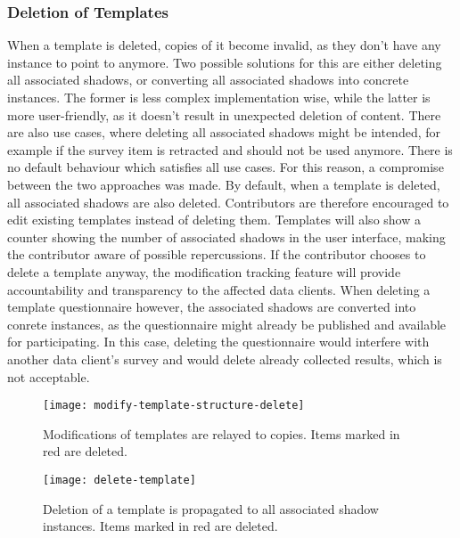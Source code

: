    \subsubsection{Deletion of Templates}
        When a template is deleted, copies of it become invalid,
        as they don't have any instance to point to anymore.
        Two possible solutions for this are either deleting
        all associated shadows, or converting all associated
        shadows into concrete instances. 
        The former is less complex implementation wise, while the 
        latter is more user-friendly, as it doesn't result in unexpected 
        deletion of content. There are also use cases, where
        deleting all associated shadows might be intended,
        for example if the survey item is retracted
        and should not be used anymore. There is no
        default behaviour which satisfies all use cases.
        For this reason, a compromise between the two
        approaches was made. By default, when a template
        is deleted, all associated shadows are also deleted.
        Contributors are therefore encouraged to edit existing
        templates instead of deleting them. Templates
        will also show a counter showing the number of
        associated shadows in the user interface, making the
        contributor aware of possible repercussions.
        If the contributor chooses to delete a template anyway,
        the modification tracking feature will provide
        accountability and transparency to the affected data clients.
        When deleting a template questionnaire however, the
        associated shadows are converted into conrete instances,
        as the questionnaire might already be published and
        available for participating. In this case, deleting
        the questionnaire would interfere with another data
        client's survey and would delete already collected results,
        which is not acceptable.

                \begin{wrapfigure}{o}{.7\textwidth}
            \centering
            \texttt{[image: modify-template-structure-delete]}
            \caption{Modifications of templates are relayed to copies. Items marked in red are deleted.}
            \label{fig:modify-concrete-structure}
        \end{wrapfigure}

        \begin{figure}[H]
            \centering
            \texttt{[image: delete-template]}
            \caption{Deletion of a template is propagated to all associated shadow instances. Items marked in red are deleted.}
            \label{fig:delete-template}
        \end{figure}

